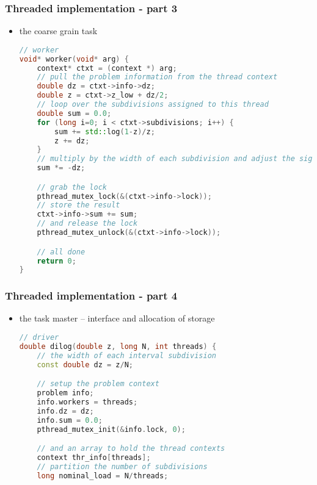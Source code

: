 \begin{frame}[fragile]
%
  \frametitle{Threaded implementation - part 3}
%
  \begin{itemize}
  \item the coarse grain task
  \begin{lstlisting}[language=c++,name=threaded]
// worker
void* worker(void* arg) {
    context* ctxt = (context *) arg;
    // pull the problem information from the thread context
    double dz = ctxt->info->dz;
    double z = ctxt->z_low + dz/2;
    // loop over the subdivisions assigned to this thread
    double sum = 0.0;
    for (long i=0; i < ctxt->subdivisions; i++) {
        sum += std::log(1-z)/z;
        z += dz;
    }
    // multiply by the width of each subdivision and adjust the sign
    sum *= -dz;

    // grab the lock
    pthread_mutex_lock(&(ctxt->info->lock));
    // store the result
    ctxt->info->sum += sum;
    // and release the lock
    pthread_mutex_unlock(&(ctxt->info->lock));

    // all done
    return 0;
}
  \end{lstlisting}
%
  \end{itemize}
%
\end{frame}

\begin{frame}[fragile]
%
  \frametitle{Threaded implementation - part 4}
%
  \begin{itemize}
  \item the task master -- interface and allocation of storage
  \begin{lstlisting}[language=c++,name=threaded]
// driver
double dilog(double z, long N, int threads) {
    // the width of each interval subdivision
    const double dz = z/N;

    // setup the problem context
    problem info;
    info.workers = threads;
    info.dz = dz;
    info.sum = 0.0;
    pthread_mutex_init(&info.lock, 0);

    // and an array to hold the thread contexts
    context thr_info[threads];
    // partition the number of subdivisions
    long nominal_load = N/threads;

  \end{lstlisting}
%
  \end{itemize}
%
\end{frame}

